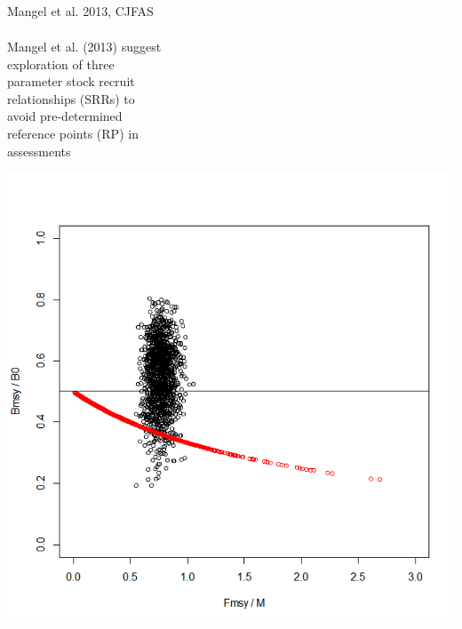 \documentclass[ xcolor = pdftex, dvipsnames, table ]{beamer}
\begin{document}
\begin{frame}{Mangel et al. 2013, CJFAS}
{\begin{minipage}[h!]{0.55\textwidth}
\begin{align*}
\end{align*}
\hspace*{0.3cm} Mangel et al. (2013) suggest\\
\hspace*{0.3cm} exploration of three\\
\hspace*{0.3cm} parameter stock recruit\\
\hspace*{0.3cm} relationships (SRRs) to\\
\hspace*{0.3cm} avoid pre-determined\\ 
\hspace*{0.3cm} reference points (RP) in\\
\hspace*{0.3cm} assessments\\
\end{minipage}
\begin{minipage}[h!]{0.45\textwidth}
\hspace*{-0.23cm}
\includegraphics[width=1.2\textwidth]{cjasFig.png}
\end{minipage}
}
\end{frame}
\end{document}
